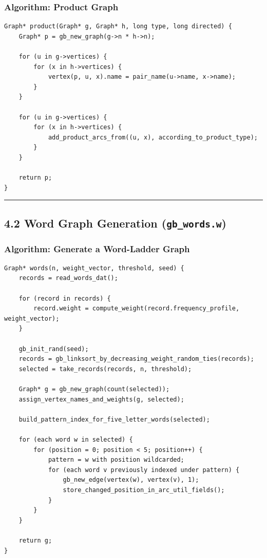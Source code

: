 \documentclass[11pt]{article}
\begin{document}
\subsubsection{Algorithm: Product Graph}\label{algorithm-product-graph}

\begin{verbatim}
Graph* product(Graph* g, Graph* h, long type, long directed) {
    Graph* p = gb_new_graph(g->n * h->n);

    for (u in g->vertices) {
        for (x in h->vertices) {
            vertex(p, u, x).name = pair_name(u->name, x->name);
        }
    }

    for (u in g->vertices) {
        for (x in h->vertices) {
            add_product_arcs_from((u, x), according_to_product_type);
        }
    }

    return p;
}
\end{verbatim}

\begin{center}\rule{0.5\linewidth}{0.5pt}\end{center}

\subsection{\texorpdfstring{4.2 Word Graph Generation (\texttt{gb\_words.w})}{4.2 Word Graph Generation (gb\_words.w)}}\label{word-graph-generation-gb_words.w}

\subsubsection{Algorithm: Generate a Word-Ladder Graph}\label{algorithm-generate-a-word-ladder-graph}

\begin{verbatim}
Graph* words(n, weight_vector, threshold, seed) {
    records = read_words_dat();

    for (record in records) {
        record.weight = compute_weight(record.frequency_profile, weight_vector);
    }

    gb_init_rand(seed);
    records = gb_linksort_by_decreasing_weight_random_ties(records);
    selected = take_records(records, n, threshold);

    Graph* g = gb_new_graph(count(selected));
    assign_vertex_names_and_weights(g, selected);

    build_pattern_index_for_five_letter_words(selected);

    for (each word w in selected) {
        for (position = 0; position < 5; position++) {
            pattern = w with position wildcarded;
            for (each word v previously indexed under pattern) {
                gb_new_edge(vertex(w), vertex(v), 1);
                store_changed_position_in_arc_util_fields();
            }
        }
    }

    return g;
}
\end{verbatim}
\end{document}
